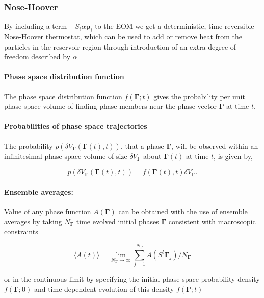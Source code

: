 \documentclass[a4paper,12pt,nofootinbib]{article}
\begin{document}
\subsubsection{Nose-Hoover}
By including a term $-S_i \alpha \bm{p}_i $ to the EOM we get a deterministic, time-reversible Nose-Hoover thermostat, which can be used to add or remove heat from the particles in the reservoir region through introduction of an extra degree of freedom described by $\alpha$


\paragraph{Phase space distribution function}

The phase space distribution function $f(\bm{\Gamma};t)$ gives the probability per unit phase space volume of finding phase members near the phase vector $\bm{\Gamma}$ at time $t$.

\paragraph{Probabilities of phase space trajectories }
The probability $p(\delta V_{\bm{\Gamma}}(\bm{\Gamma}(t),t))$, that a phase $\bm{\Gamma}$, will be observed within an infinitesimal phase space volume of size $\delta V_{\bm{\Gamma}}$ about $\bm{\Gamma}(t)$ at time $t$, is given by,

\begin{equation}
  p(\delta V_{\bm{\Gamma}}(\bm{\Gamma}(t),t)) = f(\bm{\Gamma}(t),t)\delta V_{\bm{\Gamma}}.
\end{equation}


\paragraph{Ensemble averages:}

Value of any phase function $A(\bm{\Gamma})$ can be obtained with the use of ensemble averages by taking $N_{\bm{\Gamma}} $ time evolved initial phases $\bm{\Gamma}$ consistent with macroscopic constraints

\begin{equation}
  \langle A(t) \rangle = \lim_{N_{\bm{\Gamma}}
 \to \infty} \sum_{j=1}^{N_{\bm{\Gamma}}} A(S^t \bm{\Gamma}_j)/N_{\bm{\Gamma}}
\end{equation}

or in the continuous limit by specifying the initial phase space probability density $f(\bm{\Gamma};0)$ and time-dependent evolution of this density $f(\bm{\Gamma};t)$
\end{document}
